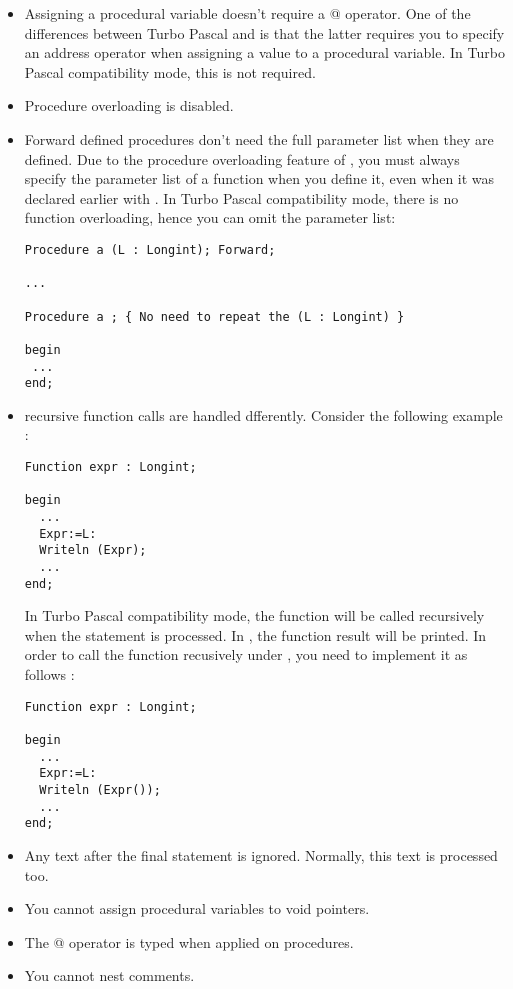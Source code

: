 \documentclass{report}
\begin{document}
\begin{itemize}
\item Assigning a procedural variable doesn't require a @ operator. One of
the differences between Turbo Pascal and \fpk is that the latter requires
you to specify an address operator when assigning a value to a procedural
variable. In Turbo Pascal compatibility mode, this is not required.
\item Procedure overloading is disabled.
\item Forward defined procedures don't need the full parameter list when
they are defined. Due to the procedure overloading feature of \fpk, you must
always specify the parameter list of a function when you define it, even
when it was declared earlier with . In Turbo Pascal
compatibility mode, there is no function overloading, hence you can omit the
parameter list:
\begin{verbatim}
Procedure a (L : Longint); Forward;

...

Procedure a ; { No need to repeat the (L : Longint) }

begin
 ...
end;

\end{verbatim}
\item recursive function calls are handled dfferently. Consider the
following example :
\begin{verbatim}
Function expr : Longint;

begin
  ...
  Expr:=L:
  Writeln (Expr); 
  ...
end;
\end{verbatim}
In Turbo Pascal compatibility mode, the function will be called recursively 
when the  statement is processed. In \fpk, the function result
will be printed. In order to call the function recusively under \fpk, you
need to implement it as follows :
\begin{verbatim}
Function expr : Longint;

begin
  ...
  Expr:=L:
  Writeln (Expr()); 
  ...
end;
\end{verbatim}
\item Any text after the final  statement is ignored. Normally,
this text is processed too.
\item You cannot assign procedural variables to void pointers.
\item The @ operator is typed when applied on procedures.
\item You cannot nest comments. 
\end{itemize}
\end{document}
